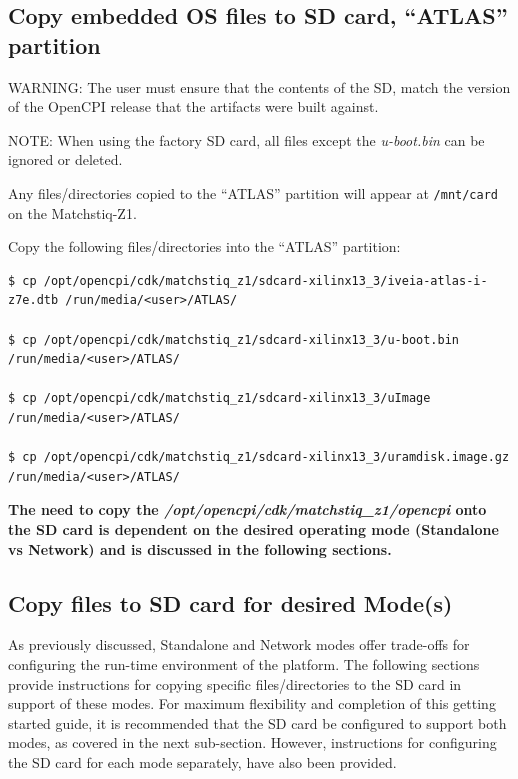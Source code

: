 \subsection{Copy embedded OS files to SD card, ``ATLAS'' partition}
\label{sec:Copy embedded OS to SD card}
\begin{flushleft}

WARNING: The user must ensure that the contents of the SD, match the version of the OpenCPI release that the artifacts were built against.\\ \medskip

NOTE: When using the factory SD card, all files except the \textit{u-boot.bin} can be ignored or deleted. \\ \medskip

Any files/directories copied to the ``ATLAS'' partition will appear at \texttt{/mnt/card} on the Matchstiq-Z1.\\ \medskip

Copy the following files/directories into the ``ATLAS'' partition:
\begin{verbatim}
$ cp /opt/opencpi/cdk/matchstiq_z1/sdcard-xilinx13_3/iveia-atlas-i-z7e.dtb /run/media/<user>/ATLAS/

$ cp /opt/opencpi/cdk/matchstiq_z1/sdcard-xilinx13_3/u-boot.bin /run/media/<user>/ATLAS/

$ cp /opt/opencpi/cdk/matchstiq_z1/sdcard-xilinx13_3/uImage /run/media/<user>/ATLAS/

$ cp /opt/opencpi/cdk/matchstiq_z1/sdcard-xilinx13_3/uramdisk.image.gz /run/media/<user>/ATLAS/
\end{verbatim}

\textbf{The need to copy the \textit{/opt/opencpi/cdk/matchstiq\_z1/opencpi} onto the SD card is dependent on the desired operating mode (Standalone vs Network) and is discussed in the following sections.}
\end{flushleft}

\subsection{Copy files to SD card for desired Mode(s)}
As previously discussed, Standalone and Network modes offer trade-offs for configuring the run-time environment of the platform. The following sections provide instructions for copying specific files/directories to the SD card in support of these modes. For maximum flexibility and completion of this getting started guide, it is recommended that the SD card be configured to support both modes, as covered in the next sub-section. However, instructions for configuring the SD card for each mode separately, have also been provided.

